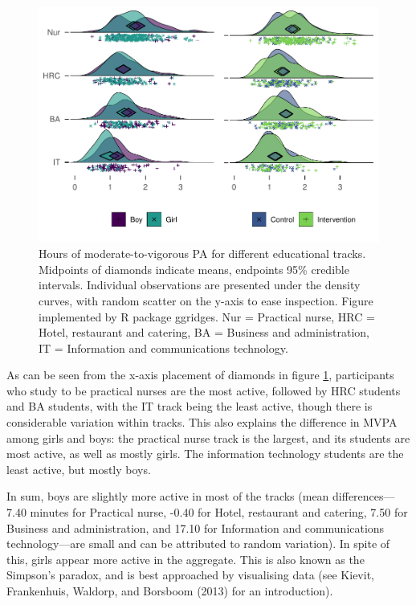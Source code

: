 \documentclass[english,floatsintext,]{apa6}
\theoremstyle{definition}
\theoremstyle{definition}
\theoremstyle{definition}
\theoremstyle{remark}
\begin{document}
\begin{figure}
\centering
\includegraphics{_baseline-manuscript_files/figure-latex/MVPA-accelerometer-plot-1.pdf}
\caption{\label{fig:MVPA-accelerometer-plot}Hours of moderate-to-vigorous PA
for different educational tracks. Midpoints of diamonds indicate means,
endpoints 95\% credible intervals. Individual observations are presented
under the density curves, with random scatter on the y-axis to ease
inspection. Figure implemented by R package ggridges. Nur = Practical
nurse, HRC = Hotel, restaurant and catering, BA = Business and
administration, IT = Information and communications technology.}
\end{figure}

As can be seen from the x-axis placement of diamonds in figure
\ref{fig:MVPA-accelerometer-plot}, participants who study to be
practical nurses are the most active, followed by HRC students and BA
students, with the IT track being the least active, though there is
considerable variation within tracks. This also explains the difference
in MVPA among girls and boys: the practical nurse track is the largest,
and its students are most active, as well as mostly girls. The
information technology students are the least active, but mostly boys.

In sum, boys are slightly more active in most of the tracks (mean
differences---7.40 minutes for Practical nurse, -0.40 for Hotel,
restaurant and catering, 7.50 for Business and administration, and 17.10
for Information and communications technology---are small and can be
attributed to random variation). In spite of this, girls appear more
active in the aggregate. This is also known as the Simpson's paradox,
and is best approached by visualising data (see Kievit, Frankenhuis,
Waldorp, and Borsboom (2013) for an introduction).
\end{document}
